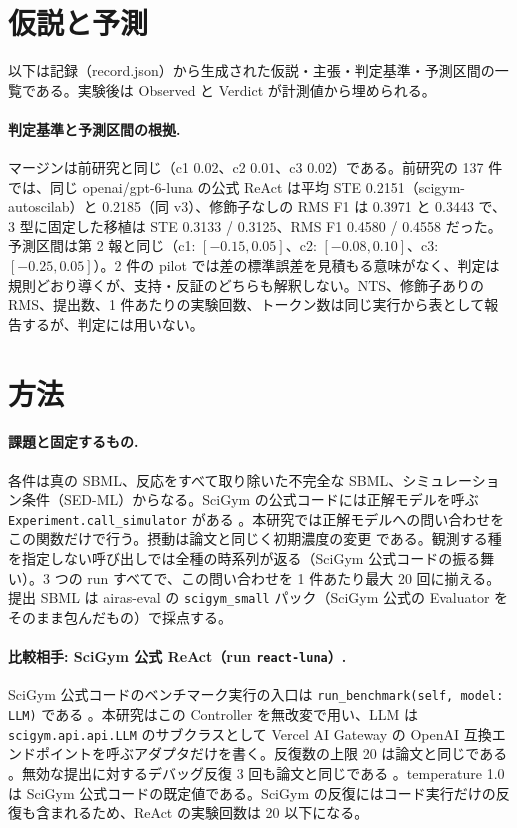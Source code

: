 \documentclass{article}
\providecommand{\unverified}[1]{#1}
\begin{document}
\section{仮説と予測}
\label{sec:hypothesis}
以下は記録（record.json）から生成された仮説・主張・判定基準・予測区間の一覧である。実験後は Observed と Verdict が計測値から埋められる。



\paragraph{判定基準と予測区間の根拠.}
マージンは前研究と同じ（c1 0.02、c2 0.01、c3 0.02）である。前研究の 137 件では、同じ openai/gpt-6-luna の公式 ReAct は平均 STE \unverified{0.2151}（scigym-autoscilab）と \unverified{0.2185}（同 v3）、修飾子なしの RMS F1 は \unverified{0.3971} と \unverified{0.3443} で、3 型に固定した移植は STE \unverified{0.3133} / \unverified{0.3125}、RMS F1 \unverified{0.4580} / \unverified{0.4558} だった。予測区間は第 2 報と同じ（c1: $[-0.15, 0.05]$、c2: $[-0.08, 0.10]$、c3: $[-0.25, 0.05]$）。2 件の pilot では差の標準誤差を見積もる意味がなく、判定は規則どおり導くが、支持・反証のどちらも解釈しない。NTS、修飾子ありの RMS、提出数、1 件あたりの実験回数、トークン数は同じ実行から表として報告するが、判定には用いない。

\section{方法}
\label{sec:method}
\paragraph{課題と固定するもの.}
各件は真の SBML、反応をすべて取り除いた不完全な SBML、シミュレーション条件（SED-ML）からなる。SciGym の公式コードには正解モデルを呼ぶ \texttt{Experiment.call\_simulator} がある \cite[s1.p12]{duan-2025-measuring}。本研究では正解モデルへの問い合わせをこの関数だけで行う。摂動は論文と同じく初期濃度の変更 \cite[s1.p4]{duan-2025-measuring} である。観測する種を指定しない呼び出しでは全種の時系列が返る（SciGym 公式コードの振る舞い）。3 つの run すべてで、この問い合わせを 1 件あたり最大 20 回に揃える。提出 SBML は airas-eval の \texttt{scigym\_small} パック（SciGym 公式の Evaluator をそのまま包んだもの）で採点する。

\paragraph{比較相手: SciGym 公式 ReAct（run \texttt{react-luna}）.}
SciGym 公式コードのベンチマーク実行の入口は \texttt{run\_benchmark(self, model: LLM)} である \cite[s1.p11]{duan-2025-measuring}。本研究はこの Controller を無改変で用い、LLM は \texttt{scigym.api.api.LLM} のサブクラスとして Vercel AI Gateway の OpenAI 互換エンドポイントを呼ぶアダプタだけを書く。反復数の上限 20 は論文と同じである \cite[s1.p1]{duan-2025-measuring}。無効な提出に対するデバッグ反復 3 回も論文と同じである \cite[s1.p2]{duan-2025-measuring}。temperature 1.0 は SciGym 公式コードの既定値である。SciGym の反復にはコード実行だけの反復も含まれるため、ReAct の実験回数は 20 以下になる。
\end{document}
